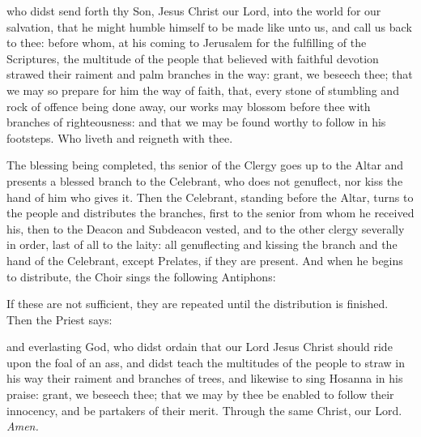{} who didst send forth thy Son, Jesus Christ our Lord, into the world for our salvation, that he might humble himself to be made like unto us, and call us back to thee: before whom, at his coming to Jerusalem for the fulfilling of the Scriptures, the multitude of the people that believed with faithful devotion strawed their raiment and palm branches in the way: grant, we beseech thee; that we may so prepare for him the way of faith, that, every stone of stumbling and rock of offence being done away, our works may blossom before thee with branches of righteousness: and that we may be found worthy to follow in his footsteps. Who liveth and reigneth with thee.
\begin{rubric}
    The blessing being completed, ths senior of the Clergy goes up to the Altar and presents a blessed branch to the Celebrant, who does not genuflect, nor kiss the hand of him who gives it. Then the Celebrant, standing before the Altar, turns to the people and distributes the branches, first to the senior from whom he received his, then to the Deacon and Subdeacon vested, and to the other clergy severally in order, last of all to the laity: all genuflecting and kissing the branch and the hand of the Celebrant, except Prelates, if they are present. And when he begins to distribute, the Choir sings the following Antiphons:
\end{rubric}\par
{}\par
{}
\begin{rubric}
    If these are not sufficient, they are repeated until the distribution is finished. Then the Priest says:
\end{rubric}
{} and everlasting God, who didst ordain that our Lord Jesus Christ should ride upon the foal of an ass, and didst teach the multitudes of the people to straw in his way their raiment and branches of trees, and likewise to sing Hosanna in his praise: grant, we beseech thee; that we may by thee be enabled to follow their innocency, and be partakers of their merit. Through the same Christ, our Lord. \textit{Amen.}

